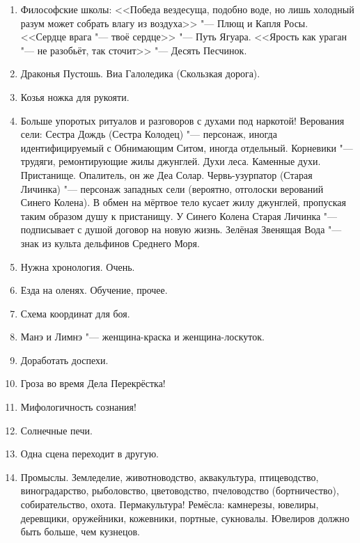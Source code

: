 \documentclass[a4paper,10pt,fleqn]{book}
\begin{document}
\begin{enumerate}
\item Философские школы: <<Победа вездесуща, подобно воде, но лишь холодный разум может собрать влагу из воздуха>> "--- Плющ и Капля Росы.
<<Сердце врага "--- твоё сердце>> "--- Путь Ягуара.
<<Ярость как ураган "--- не разобьёт, так сточит>> "--- Десять Песчинок.

\item Драконья Пустошь.
Виа Галоледика (Скользкая дорога).

\item Козья ножка для рукояти.

\item Больше упоротых ритуалов и разговоров с духами под наркотой!
Верования сели: Сестра Дождь (Сестра Колодец) "--- персонаж, иногда идентифицируемый с Обнимающим Ситом, иногда отдельный.
Корневики "--- трудяги, ремонтирующие жилы джунглей.
Духи леса.
Каменные духи.
Пристанище.
Опалитель, он же Деа Солар.
Червь-узурпатор (Старая Личинка) "--- персонаж западных сели (вероятно, отголоски верований Синего Колена).
В обмен на мёртвое тело кусает жилу джунглей, пропуская таким образом душу к пристанищу.
У Синего Колена Старая Личинка "--- подписывает с душой договор на новую жизнь.
Зелёная Звенящая Вода "--- знак из культа дельфинов Среднего Моря.

\item Нужна хронология.
Очень.

\item Езда на оленях.
Обучение, прочее.

\item Схема координат для боя.

\item Манэ и Лимнэ "--- женщина-краска и женщина-лоскуток.

\item Доработать доспехи.

\item Гроза во время Дела Перекрёстка!

\item Мифологичность сознания!

\item Солнечные печи.

\item Одна сцена переходит в другую.

\item Промыслы.
Земледелие, животноводство, аквакультура, птицеводство, виноградарство, рыболовство, цветоводство, пчеловодство (бортничество), собирательство, охота.
Пермакультура!
Ремёсла: камнерезы, ювелиры, деревщики, оружейники, кожевники, портные, сукновалы.
Ювелиров должно быть больше, чем кузнецов.


\end{enumerate}
\end{document}
